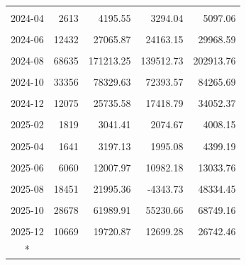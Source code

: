 \begin{longtable}[t]{crrrr}
\cellcolor{gray!10}{2024-03} & \cellcolor{gray!10}{5448} & \cellcolor{gray!10}{18363.43} & \cellcolor{gray!10}{15177.94} & \cellcolor{gray!10}{21548.92}\\
2024-04 & 2613 & 4195.55 & 3294.04 & 5097.06\\
\cellcolor{gray!10}{2024-05} & \cellcolor{gray!10}{6324} & \cellcolor{gray!10}{11971.78} & \cellcolor{gray!10}{10831.53} & \cellcolor{gray!10}{13112.03}\\
2024-06 & 12432 & 27065.87 & 24163.15 & 29968.59\\
\cellcolor{gray!10}{2024-07} & \cellcolor{gray!10}{22478} & \cellcolor{gray!10}{27585.81} & \cellcolor{gray!10}{21912.27} & \cellcolor{gray!10}{33259.36}\\
2024-08 & 68635 & 171213.25 & 139512.73 & 202913.76\\
\cellcolor{gray!10}{2024-09} & \cellcolor{gray!10}{83154} & \cellcolor{gray!10}{248178.13} & \cellcolor{gray!10}{228042.78} & \cellcolor{gray!10}{268313.47}\\
2024-10 & 33356 & 78329.63 & 72393.57 & 84265.69\\
\cellcolor{gray!10}{2024-11} & \cellcolor{gray!10}{22663} & \cellcolor{gray!10}{48180.02} & \cellcolor{gray!10}{40448.33} & \cellcolor{gray!10}{55911.70}\\
2024-12 & 12075 & 25735.58 & 17418.79 & 34052.37\\
\cellcolor{gray!10}{2025-01} & \cellcolor{gray!10}{3137} & \cellcolor{gray!10}{4990.69} & \cellcolor{gray!10}{3397.20} & \cellcolor{gray!10}{6584.19}\\
2025-02 & 1819 & 3041.41 & 2074.67 & 4008.15\\
\cellcolor{gray!10}{2025-03} & \cellcolor{gray!10}{2357} & \cellcolor{gray!10}{4134.70} & \cellcolor{gray!10}{2705.83} & \cellcolor{gray!10}{5563.56}\\
2025-04 & 1641 & 3197.13 & 1995.08 & 4399.19\\
\cellcolor{gray!10}{2025-05} & \cellcolor{gray!10}{4263} & \cellcolor{gray!10}{7987.92} & \cellcolor{gray!10}{7401.28} & \cellcolor{gray!10}{8574.55}\\
2025-06 & 6060 & 12007.97 & 10982.18 & 13033.76\\
\cellcolor{gray!10}{2025-07} & \cellcolor{gray!10}{9803} & \cellcolor{gray!10}{18986.97} & \cellcolor{gray!10}{15408.00} & \cellcolor{gray!10}{22565.93}\\
2025-08 & 18451 & 21995.36 & -4343.73 & 48334.45\\
\cellcolor{gray!10}{2025-09} & \cellcolor{gray!10}{28214} & \cellcolor{gray!10}{33348.33} & \cellcolor{gray!10}{15387.75} & \cellcolor{gray!10}{51308.92}\\
2025-10 & 28678 & 61989.91 & 55230.66 & 68749.16\\
\cellcolor{gray!10}{2025-11} & \cellcolor{gray!10}{21301} & \cellcolor{gray!10}{42954.36} & \cellcolor{gray!10}{36211.91} & \cellcolor{gray!10}{49696.81}\\
2025-12 & 10669 & 19720.87 & 12699.28 & 26742.46\\*
\end{longtable}
